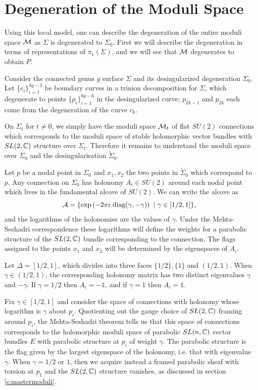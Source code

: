 \section{Degeneration of the Moduli Space}
	Using this local model, one can describe the degeneration of the entire moduli space $\mathcal{M}$ as $\Sigma$ is degenerated to $\Sigma_0$. First we will describe the degeneration in terms of representations of $\pi_1(\Sigma)$, and we will see that $\mathcal{M}$ degenerates to obtain $P$.
	
	Consider the connected genus $g$ surface $\Sigma$ and its desingularized degeneration $\Sigma_0$. Let $\{c_i\}_{i=1}^{3g-3}$ be boundary curves in a trinion decomposition for $\Sigma$, which degenerate to points $\{p_i\}_{i=1}^{6g-6}$ in the desingularized curve; $p_{2k-1}$ and $p_{2k}$ each come from the degeneration of the curve $c_k$. 
	
	On $\Sigma_t$ for $t\neq 0$, we simply have the moduli space $\mathcal{M}_t$ of flat $SU(2)$ connections which corresponds to the moduli space of stable holomorphic vector bundles with $SL(2,\mathbb{C})$ structure over $\Sigma_t$. Therefore it remains to understand the moduli space over $\Sigma_0$ and the desingularisation $\tilde{\Sigma}_0$. 
	
	Let $p$ be a nodal point in $\Sigma_0$ and $x_1,x_2$ the two points in $\tilde{\Sigma}_0$ which correspond to $p$. Any connection on $\Sigma_0$ has holonomy $A_i\in SU(2)$ around each nodal point which lives in the fundamental alcove of $SU(2)$. We can write the alcove as
	\begin{equation}
		\mathcal{A} = \{\exp\left(
		-2\pi i ~\text{diag}(\gamma, -\gamma)
		\right)~|~ \gamma \in[1/2,1]\},
	\end{equation}
	and the logarithms of the holonomies are the values of $\gamma$. Under the Mehta-Seshadri correspondence these logarithms will define the weights for a parabolic structure of the $SL(2,\mathbb{C})$ bundle corresponding to the connection. The flags assigned to the points $x_1$ and $x_2$ will be determined by the eigenspaces of $A_i$.
	
	Let $\Delta = [1/2,1]$, which divides into three faces $\{1/2\}, \{1\}$ and $(1/2,1)$. When $\gamma \in (1/2,1)$, the corresponding holonomy matrix has two distinct eigenvalues $\gamma$ and $-\gamma$.  If $\gamma=1/2$ then $A_i = -\mathds{1}$, and if $\gamma = 1$ then $A_i = \mathds{1}$.
	
	Fix $\gamma \in [1/2,1]$ and consider the space of connections with holonomy whose logarithm is $\gamma$ about $p_i$. Quotienting out the gauge choice of $SL(2,\mathbb{C})$ framing around $p_i$, the Mehta-Seshadri theorem \cite{mehta_moduli_1980} tells us that this space of connections corresponds to the holomorphic moduli space of parabolic $SL(n,\mathbb{C})$ vector bundles $E$ with parabolic structure at $p_i$ of weight $\gamma$. The parabolic structure is the flag given by the largest eigenspace of the holonomy, i.e. that with eigenvalue $\gamma$. When $\gamma = 1/2$ or $1$, then we acquire instead a framed parabolic sheaf with torsion at $p_1$ and the $SL(2,\mathbb{C})$ structure vanishes, as discussed in section \ref{s:mastermoduli}.
		
